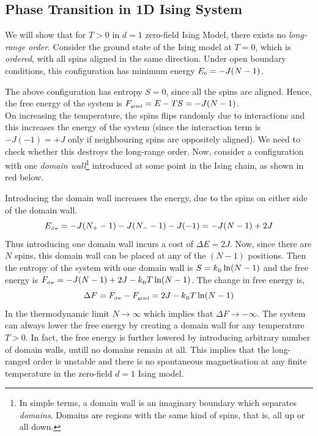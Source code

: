 \subsection{Phase Transition in 1D Ising System}
We will show that for $T>0$ in $d=1$ zero-field Ising Model, there exists no \textit{long-range order}. Consider the ground state of the Ising model at $T=0$, which is \textit{ordered}, with all spins aligned in the same direction. Under open boundary conditions, this configuration has minimum energy $E_{\text{\tiny 0}} = -J(N-1)$.
\begin{figure}[H]
    \centering 
    
\end{figure}
\noindent
The above configuration has entropy $S=0$, since all the spins are aligned. Hence, the free energy of the system is $F_{\text{\tiny grnd}}=E-TS = -J(N-1)$.\\[0.2cm] On increasing the temperature, the spins flips randomly due to interactions and this increases the energy of the system (since the interaction term is $-J(-1) = +J$ only if neighbouring spins are oppositely aligned). We need to check whether this destroys the long-range order. Now, consider a configuration with one \textit{domain wall}\footnote{In simple terms, a domain wall is an imaginary boundary which separates \textit{domains}. Domains are regions with the same kind of spins, that is, all up or all down. } introduced at some point in the Ising chain, as shown in red below. 
\begin{figure}[H]
    \centering 

\end{figure}
\noindent
Introducing the domain wall increases the energy, due to the spins on either side of the domain wall.
$$E_{\text{\tiny dw}}= -J(N_+-1) -J(N_- -1) -J (-1) = -J(N-1)+2J$$
Thus introducing one domain wall incurs a cost of $\Delta E = 2J$. Now, since there are $N$ spins, this domain wall can be placed at any of the $(N-1)$ positions. Then the entropy of the system with one domain wall is $S=k_{\text{\tiny B}} \ln (N-1)$ and the free energy is $F_{\text{\tiny dw}} = -J(N-1) + 2J - k_{\text{\tiny B}} T\ln (N-1)$. The change in free energy is, 
$$\Delta  F= F_{\text{\tiny dw}} - F_{\text{\tiny grnd}} = 2J - k_{\text{\tiny B}} T\ln (N-1)$$
In the thermodynamic limit $N\to \infty$ which implies that $\Delta F \to -\infty$. The system can always lower the free energy by creating a domain wall for any temperature $T>0$. In fact, the free energy is further lowered by introducing arbitrary number of domain walls, untill no domains remain at all. This implies that the long-ranged order is unstable and there is no spontaneous magnetisation at any finite temperature in the zero-field $d=1$ Ising model. 

